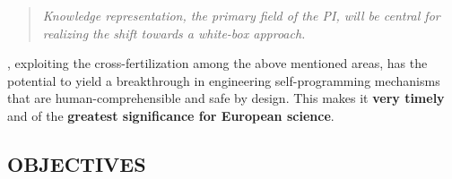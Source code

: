 \begin{quote}{\it
Knowledge representation, the primary field of the PI, will be central for realizing the shift towards a white-box approach.}
\end{quote}


\project, exploiting the cross-fertilization among the above mentioned areas, has the potential to yield a breakthrough in engineering self-programming mechanisms that are human-comprehensible and safe by design. This makes it \textbf{very timely} and of the \textbf{greatest significance for European science}.


\vspace{-1ex}

\subsection*{OBJECTIVES}

\vspace{-1ex}

